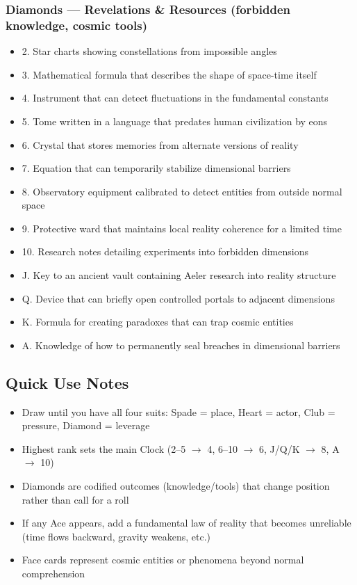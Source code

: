 \documentclass[11pt]{article}
\begin{document}
\subsubsection{Diamonds — Revelations \& Resources (forbidden knowledge, cosmic tools)}
\begin{itemize}[leftmargin=*]
\item 2. Star charts showing constellations from impossible angles
\item 3. Mathematical formula that describes the shape of space-time itself
\item 4. Instrument that can detect fluctuations in the fundamental constants
\item 5. Tome written in a language that predates human civilization by eons
\item 6. Crystal that stores memories from alternate versions of reality
\item 7. Equation that can temporarily stabilize dimensional barriers
\item 8. Observatory equipment calibrated to detect entities from outside normal space
\item 9. Protective ward that maintains local reality coherence for a limited time
\item 10. Research notes detailing experiments into forbidden dimensions
\item J. Key to an ancient vault containing Aeler research into reality structure
\item Q. Device that can briefly open controlled portals to adjacent dimensions
\item K. Formula for creating paradoxes that can trap cosmic entities
\item A. Knowledge of how to permanently seal breaches in dimensional barriers
\end{itemize}

\subsection*{Quick Use Notes}
\begin{itemize}[leftmargin=*]
\item Draw until you have all four suits: Spade = place, Heart = actor, Club = pressure, Diamond = leverage
\item Highest rank sets the main Clock (2--5 $\rightarrow$ 4, 6--10 $\rightarrow$ 6, J/Q/K $\rightarrow$ 8, A $\rightarrow$ 10)
\item Diamonds are codified outcomes (knowledge/tools) that change position rather than call for a roll
\item If any Ace appears, add a fundamental law of reality that becomes unreliable (time flows backward, gravity weakens, etc.)
\item Face cards represent cosmic entities or phenomena beyond normal comprehension
\end{itemize}
\end{document}
